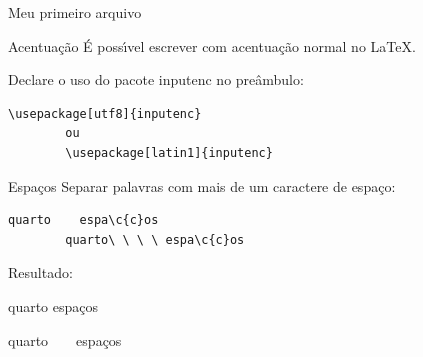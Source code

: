 \documentclass{beamer}
\newcommand{\tbs}{\textbackslash}
\begin{document}

\begin{frame}{Meu primeiro arquivo}
    
\end{frame}

\begin{frame}[fragile]{Acentua\c{c}\~ao}
    \'E poss\'{\i}vel escrever com acentua\c{c}\~ao normal no \LaTeX.

    \vspace{1cm}
    Declare o uso do pacote inputenc no pre\^ambulo:
    \begin{lstlisting}[style=limpo]
        \usepackage[utf8]{inputenc}
        ou
        \usepackage[latin1]{inputenc}
    \end{lstlisting}
\end{frame}

\begin{frame}[fragile]{Espa\c{c}os}
    Separar palavras com mais de um caractere de espa\c{c}o:
    \begin{lstlisting}[style=limpo]
        quarto    espa\c{c}os
        quarto\ \ \ \ espa\c{c}os
    \end{lstlisting}

    Resultado:
    \begin{center}
        quarto    espa\c{c}os

        quarto\ \ \ \ espa\c{c}os
    \end{center}
\end{frame}
\end{document}
